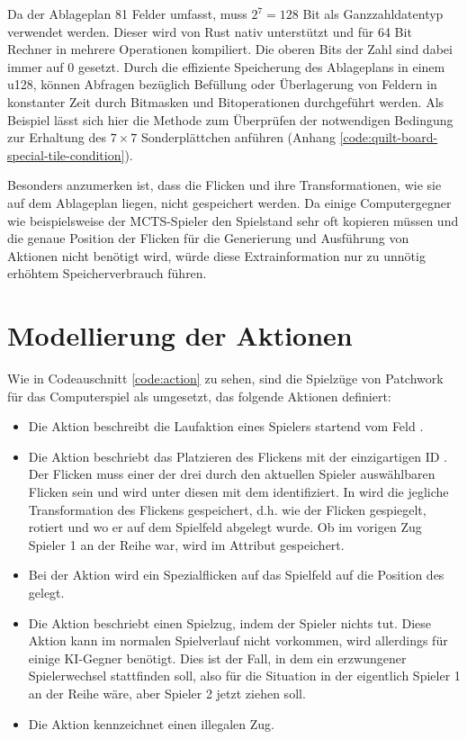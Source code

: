 Da der Ablageplan 81 Felder umfasst, muss $2^7=128$ Bit als Ganzzahldatentyp verwendet werden. Dieser wird von Rust nativ unterstützt und für 64 Bit Rechner in mehrere Operationen kompiliert. Die oberen Bits der Zahl sind dabei immer auf 0 gesetzt. Durch die effiziente Speicherung des Ablageplans in einem \ac{u128}, können Abfragen bezüglich Befüllung oder Überlagerung von Feldern in konstanter Zeit durch Bitmasken und Bitoperationen durchgeführt werden. Als Beispiel lässt sich hier die Methode zum Überprüfen der notwendigen Bedingung zur Erhaltung des $7\times 7$ Sonderplättchen anführen (Anhang \ref{code:quilt-board-special-tile-condition}).

Besonders anzumerken ist, dass die Flicken und ihre Transformationen, wie sie auf dem Ablageplan liegen, nicht gespeichert werden. Da einige Computergegner wie beispielsweise der \ac{MCTS}-Spieler den Spielstand sehr oft kopieren müssen und die genaue Position der Flicken für die Generierung und Ausführung von Aktionen nicht benötigt wird, würde diese Extrainformation nur zu unnötig erhöhtem Speicherverbrauch führen.

\section{Modellierung der Aktionen}

Wie in Codeauschnitt \ref{code:action} zu sehen, sind die Spielzüge von Patchwork für das Computerspiel als  umgesetzt, das folgende Aktionen definiert:
\begin{itemize}
    \item Die Aktion  beschreibt die Laufaktion eines Spielers startend vom Feld .
    \item Die Aktion  beschriebt das Platzieren des Flickens mit der einzigartigen \ac{ID} . Der Flicken muss einer der drei durch den aktuellen Spieler auswählbaren Flicken sein und wird unter diesen mit dem  identifiziert. In  wird die jegliche Transformation des Flickens gespeichert, d.h. wie der Flicken gespiegelt, rotiert und wo er auf dem Spielfeld abgelegt wurde. Ob im vorigen Zug Spieler 1 an der Reihe war, wird im Attribut  gespeichert.
    \item Bei der Aktion  wird ein Spezialflicken auf das Spielfeld auf die Position des  gelegt.
    \item Die Aktion  beschriebt einen Spielzug, indem der Spieler nichts tut. Diese Aktion kann im normalen Spielverlauf nicht vorkommen, wird allerdings für einige \ac{KI}-Gegner benötigt. Dies ist der Fall, in dem ein erzwungener Spielerwechsel stattfinden soll, also für die Situation in der eigentlich Spieler 1 an der Reihe wäre, aber Spieler 2 jetzt ziehen soll.
    \item Die Aktion  kennzeichnet einen illegalen Zug.
\end{itemize}

